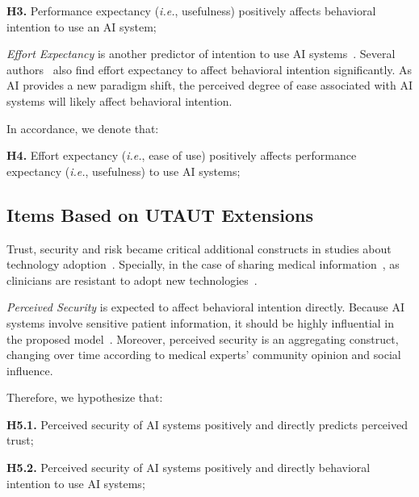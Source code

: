 \noindent
{\bf H3.} Performance expectancy ({\it i.e.}, usefulness) positively affects behavioral intention to use an AI system;

{\it Effort Expectancy} is another predictor of intention to use AI systems~\cite{doi:10.5465/amr.2019.0178}.
Several authors~\cite{Fan2020, Tran2021} also find effort expectancy to affect behavioral intention significantly.
As AI provides a new paradigm shift, the perceived degree of ease associated with AI systems will likely affect behavioral intention.

\noindent
In accordance, we denote that:

\vspace{2.25mm}

\noindent
{\bf H4.} Effort expectancy ({\it i.e.}, ease of use) positively affects performance expectancy ({\it i.e.}, usefulness) to use AI systems;

\subsection{Items Based on UTAUT Extensions}
\label{sec:chap004003002}

Trust, security and risk became critical additional constructs in studies about technology adoption~\cite{KHALILZADEH2017460, https://doi.org/10.1002/mar.20823}.
Specially, in the case of sharing medical information~\cite{6038852}, as clinicians are resistant to adopt new technologies~\cite{10.1145/3132272.3134111}.

\vspace{2.25mm}

{\it Perceived Security} is expected to affect behavioral intention directly.
Because AI systems involve sensitive patient information, it should be highly influential in the proposed model~\cite{KHALILZADEH2017460}.
Moreover, perceived security is an aggregating construct, changing over time according to medical experts' community opinion and social influence.

\vspace{2.25mm}

\noindent
Therefore, we hypothesize that:

\vspace{2.25mm}

\noindent
{\bf H5.1.} Perceived security of AI systems positively and directly predicts perceived trust;

\vspace{2.25mm}

\noindent
{\bf H5.2.} Perceived security of AI systems positively and directly behavioral intention to use AI systems;

